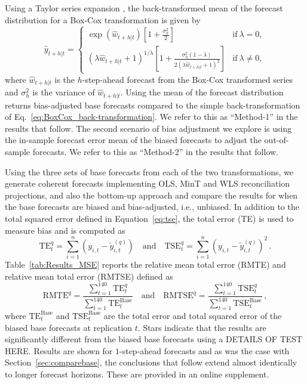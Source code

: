\documentclass[12pt]{article}
\theoremstyle{definition}
\begin{document}
Using a Taylor series expansion \citep{guerrero1993time}, the back-transformed mean of the forecast distribution for a Box-Cox transformation is given by
\begin{equation}\label{eq:BoxCox_BT_biasadj}
  \hat{y}_{t+h|t} =
    \begin{cases}
      \exp(\hat{w}_{t+h|t})\left[1+\frac{\sigma_h^2}{2}\right] & \text{if}~\lambda = 0, \\
      (\lambda \hat{w}_{t+h|t} + 1)^{1/\lambda}
        \left[1 + \frac{\sigma_h^2(1-\lambda)}{2(\lambda \hat{w}_{t+h|t} + 1)^2}\right]
                                                      & \text{if}~\lambda \ne 0,
\end{cases}
\end{equation}
where $\hat{w}_{t+h|t}$ is the $h$-step-ahead forecast from the Box-Cox transformed series and $\sigma_h^2$ is the variance of $\hat{w}_{t+h|t}$. Using the mean of the forecast distribution returns bias-adjusted base forecasts compared to the simple back-transformation of Eq.~\eqref{eq:BoxCox_back-transformation}. We refer to this as ``Method-1'' in the results that follow. The second scenario of bias adjustment we explore is using the in-sample forecast error mean of the biased forecasts to adjust the out-of-sample forecasts. We refer to this as ``Method-2'' in the results that follow.

Using the three sets of base forecasts from each of the two transformations, we generate coherent forecasts implementing OLS, MinT and WLS reconciliation projections, and also the bottom-up approach and compare the results for when the base forecasts are biased and bias-adjusted, i.e., unbiased. {\color{blue} In addition to the total squared error defined in Equation~\ref{eq:tse}, the total error (TE) is used to measure bias and is computed as
\begin{equation*}
\textrm{TE}^{q}_t=\sum\limits_{i=1}^n(y_{i,t}-\tilde{y}^{(q)}_{i,t})\quad \textrm {and}\quad \textrm{TSE}^{q}_t=\sum\limits_{i=1}^n(y_{i,t}-\tilde{y}^{(q)}_{i,t})^2\,.
\end{equation*}
Table~\ref{tab:Results_MSE} reports the relative mean total error (RMTE) and relative mean total error (RMTSE) defined as  
\begin{equation*}
\textrm{RMTE}^{q}=\frac{\sum\limits_{t=1}^{140}\textrm{TE}^{q}_t}{\sum\limits_{t=1}^{140}\textrm{TE}^{\textrm{Base}}_t}\quad \textrm {and}\quad \textrm{RMTSE}^{q}=\frac{\sum\limits_{t=1}^{140}\textrm{TSE}^{q}_t}{\sum\limits_{t=1}^{140}\textrm{TSE}^{\textrm{Base}}_t}\,,
\end{equation*}
where $\textrm{TE}^{\textrm{Base}}_t$ and $\textrm{TSE}^{\textrm{Base}}_t$ are the total error and total squared error of the biased base forecasts at replication $t$.  Stars indicate that the results are significantly different from the biased base forecasts using a DETAILS OF TEST HERE.  Results are shown for $1$-step-ahead forecasts and} as was the case with Section~\ref{sec:comparebase}, the conclusions that follow extend almost identically to longer forecast horizons. {\color{blue} These are provided in an online supplement}.
\end{document}
